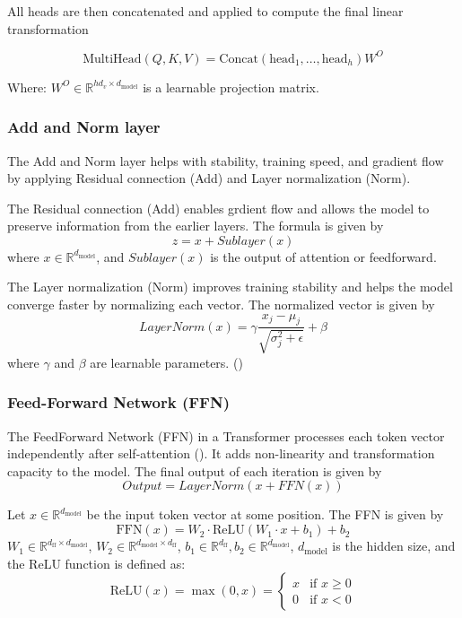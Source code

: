 \documentclass{article} %
\begin{document}
All heads are then concatenated and applied to compute the final linear transformation
   
    \[
    \text{MultiHead}(Q, K, V) = \text{Concat}(\text{head}_1, \dots, \text{head}_h)W^O
    \]


Where:
\( W^O \in \mathbb{R}^{hd_v \times d_{\text{model}}} \) is a learnable projection matrix. 

\subsubsection{Add and Norm layer}
The Add and Norm layer helps with stability, training speed, and gradient flow by applying Residual connection (Add) and Layer normalization (Norm).

The Residual connection (Add) enables grdient flow and allows the model to preserve information from the earlier layers. The formula is given by
\[z=x + Sublayer(x)\]
where \( x \in \mathbb{R}^{d_{\text{model}}} \), and $Sublayer(x)$ is the output of attention or feedforward.

The Layer normalization (Norm) improves training stability and helps the model converge faster by normalizing each vector. The normalized vector is given by
\[
LayerNorm(x) = \gamma\frac{x_j - \mu_j}{\sqrt{\sigma_j^2 + \epsilon}} + \beta
\]
where $\gamma$ and $\beta$ are learnable parameters. (\cite{chafiqui2024deepdive_transformer})

\subsubsection{Feed-Forward Network (FFN)}
The FeedForward Network (FFN) in a Transformer processes each token vector independently after self-attention (\cite{zhang2024transformer_explain}). It adds non-linearity and transformation capacity to the model. The final output of each iteration is given by 
\[Output = LayerNorm(x+FFN(x))\]

Let \( x \in \mathbb{R}^{d_{\text{model}}} \) be the input token vector at some position. The FFN is given by
\[
\text{FFN}(x) = W_2 \cdot \text{ReLU}(W_1 \cdot x + b_1) + b_2
\]
\( W_1 \in \mathbb{R}^{d_{\text{ff}} \times d_{\text{model}}} \), \( W_2 \in \mathbb{R}^{d_{\text{model}} \times d_{\text{ff}}} \), \( b_1 \in \mathbb{R}^{d_{\text{ff}}}, b_2 \in \mathbb{R}^{d_{\text{model}}} \), \( d_{\text{model}} \) is the hidden size, and the ReLU function is defined as:
\[
\text{ReLU}(x) = \max(0, x) = 
\begin{cases} 
x & \text{if } x \geq 0 \\
0 & \text{if } x < 0 
\end{cases}
\]
   
\end{document}
